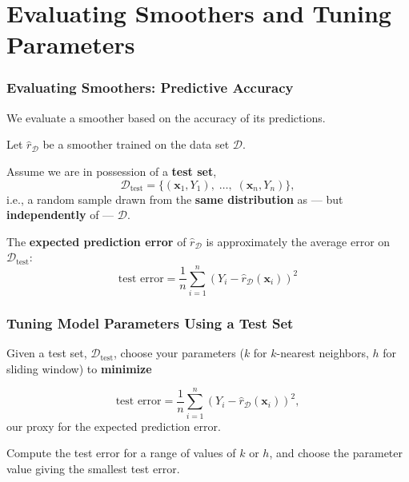 \documentclass[xcolor={dvipsnames}]{beamer}
\renewcommand{\hat}{\widehat}
\newcommand{\cD}{\mathcal{D}}
\newcommand{\vx}{\mathbf{x}}
\newcommand{\test}{{\text{test}}}
\begin{document}
\section{Evaluating Smoothers and Tuning Parameters}


\begin{frame}
    \frametitle{Evaluating Smoothers: Predictive Accuracy}
    \setlength\parskip{0.75em}

    We evaluate a smoother based on the accuracy of its predictions.

    Let $\hat r_\cD$ be a smoother trained on the data set $\cD$.

    Assume we are in possession of a \textbf{test set},
    $$\cD_\test=\{(\vx_1,Y_1),\;\ldots,\;(\vx_n, Y_n)\},$$
    i.e., a random sample drawn from the \textbf{same distribution} as --- but \textbf{independently} of --- $\cD$.

    The \textbf{expected prediction error} of $\hat r_\cD$ is approximately the average error on $\cD_\test$:
    \[
        \text{test error} = \frac1n\sum_{i=1}^n (Y_i - \hat r_\cD(\vx_i))^2
    \]
\end{frame}

\begin{frame}
    \frametitle{Tuning Model Parameters Using a Test Set}
    \setlength\parskip{1em}

    Given a test set, $\cD_\test$, choose your parameters
    ($k$ for $k$-nearest neighbors, $h$ for sliding window)
    to \textbf{minimize}
    
    \[
        \text{test error} = \frac1n\sum_{i=1}^n (Y_i - \hat r_\cD(\vx_i))^2,
    \]
    our proxy for the expected prediction error.

    Compute the test error for a range of values of $k$ or $h$,
    and choose the parameter value giving the smallest test error.
\end{frame}
\end{document}
